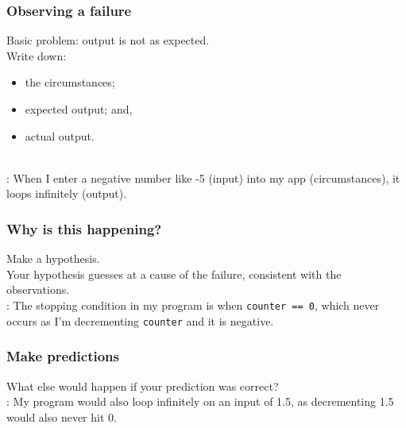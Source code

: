 \begin{frame}
\frametitle{Observing a failure}

\begin{changemargin}{1cm}
\Large

Basic problem: output is not as expected.\\[1em]

Write down:
\begin{itemize}
\item the circumstances;
\item expected output; and,
\item actual output.
\end{itemize}

~\\
: When I enter a negative number like -5 (input) into my app (circumstances), it loops infinitely (output).

\end{changemargin}

\end{frame}

\begin{frame}
\frametitle{Why is this happening?}

\begin{changemargin}{1cm}
\Large Make a hypothesis.\\[1em]

Your hypothesis guesses at a cause of the failure, consistent with 
the observations.\\[1em]

\large
{}: The stopping condition in my program is when
{\tt counter == 0}, which never occurs as I'm decrementing 
{\tt counter} and it is negative.
\end{changemargin}

\end{frame}

\begin{frame}
\frametitle{Make predictions}

\begin{changemargin}{1cm}
\Large
What else would happen if your prediction was correct?\\[1em]

\large
{}: My program would also loop infinitely on
an input of 1.5, as decrementing 1.5 would also never hit 0.

\end{changemargin}

\end{frame}

